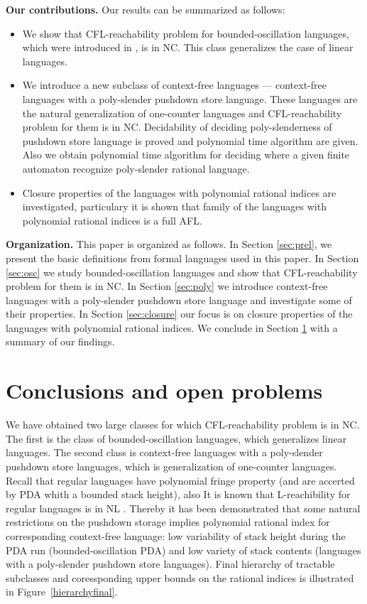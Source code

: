 \documentclass[smallextended]{svjour3}       %
\begin{document}
\textbf{Our contributions.} Our results can be summarized as follows:
\begin{itemize}
\item We show that CFL-reachability problem for bounded-oscillation languages, which were introduced in \cite{BoundOsc}, is in NC. This class generalizes the case of linear languages.
\item We introduce a new subclass of context-free languages --- context-free languages with a poly-slender pushdown store language. These languages are the natural generalization of one-counter languages and CFL-reachability problem for them is in NC. Decidability of deciding poly-slenderness of pushdown store language is proved and polynomial time algorithm are given. Also we obtain polynomial time algorithm for deciding where a given finite automaton recognize poly-slender rational language.  
\item Closure properties of the languages with polynomial rational indices are investigated, particulary it is shown that family of the languages with polynomial rational indices is a full AFL.
\end{itemize}


\textbf{Organization.} This paper is organized as follows. In Section \ref{sec:prel}, we present the basic definitions from formal languages used in this paper. In Section \ref{sec:osc} we study bounded-oscillation languages and show that CFL-reachability problem for them is in NC. In Section \ref{sec:poly} we introduce context-free languages with a poly-slender pushdown store language and investigate some of their properties. In Section \ref{sec:closure} our focus is on closure properties of the languages with polynomial rational indices. We conclude in Section \ref{sec:conc} with a summary of our findings.




\section{Conclusions and open problems}
\label{sec:conc}
We have obtained two large classes for which CFL-reachability problem is in NC. The first is the class of bounded-oscillation languages, which generalizes linear languages. The second class is 
context-free languages with a poly-slender pushdown store languages, which is generalization of one-counter languages. Recall that regular languages have polynomial fringe property (and are accerted by PDA whith a bounded stack height), also It is known that L-reachibility for regular languages is in NL \cite*{LReach, Yannakakis}. Thereby it has been demonstrated that some natural restrictions on the pushdown storage implies polynomial rational index for corresponding context-free language: low variability of stack height during the PDA run (bounded-oscillation PDA) and low variety of stack contents (languages with a poly-slender pushdown store languages). Final hierarchy of tractable subclasses and coressponding upper bounds on the rational indices is illustrated in Figure~\ref{hierarchyfinal}.
\end{document}
